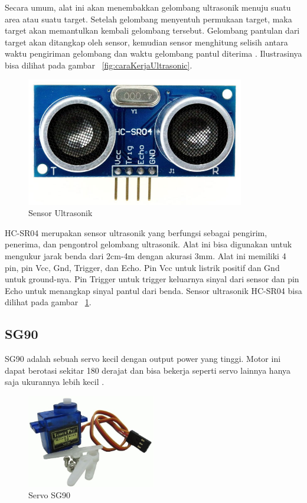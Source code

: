 Secara umum, alat ini akan menembakkan gelombang ultrasonik menuju suatu area atau suatu target. Setelah gelombang menyentuh permukaan target, maka target akan memantulkan kembali gelombang tersebut. Gelombang pantulan dari target akan ditangkap oleh sensor, kemudian sensor menghitung selisih antara waktu pengiriman gelombang dan waktu gelombang pantul diterima . Ilustrasinya bisa dilihat pada gambar ~\ref{fig:caraKerjaUltrasonic}.

\begin{figure} [H]
    \includegraphics[width=0.85\textwidth, center]{images/ultrasonik.jpg}
    \caption{Sensor Ultrasonik}
    \label{fig:SensorUltrasonicHC-SR04}
\end{figure}

HC-SR04 merupakan sensor ultrasonik yang berfungsi sebagai pengirim, penerima, dan pengontrol gelombang ultrasonik. Alat ini bisa digunakan untuk mengukur jarak benda dari 2cm-4m dengan akurasi 3mm. Alat ini memiliki 4 pin, pin Vcc, Gnd, Trigger, dan Echo. Pin Vcc untuk listrik positif dan Gnd untuk ground-nya. Pin Trigger untuk trigger keluarnya sinyal dari sensor dan pin Echo untuk menangkap sinyal pantul dari benda. Sensor ultrasonik HC-SR04 bisa dilihat pada gambar ~\ref{fig:SensorUltrasonicHC-SR04}.

\subsection{SG90}
SG90 adalah sebuah servo kecil dengan output power yang tinggi. Motor ini dapat berotasi sekitar 180 derajat dan bisa bekerja seperti servo lainnya hanya saja ukurannya lebih kecil .

\begin{figure} [H]
    \includegraphics[width=0.50\textwidth, center]{images/servo.jpg}
    \caption{Servo SG90}
    \label{fig:servo}
\end{figure}

